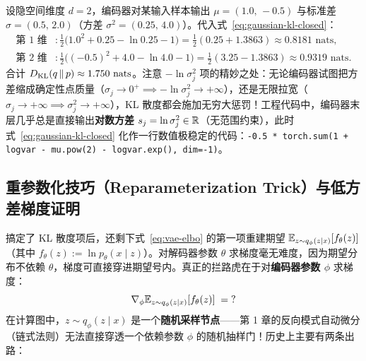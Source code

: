 \begin{example}
设隐空间维度 $d = 2$，编码器对某输入样本输出 $\mu = (1.0,\, -0.5)$ 与标准差 $\sigma = (0.5,\, 2.0)$（方差 $\sigma^2 = (0.25,\, 4.0)$）。代入式~\eqref{eq:gaussian-kl-closed}：
\begin{align*}
  \text{第 1 维} &: \frac{1}{2}\big(1.0^2 + 0.25 - \ln 0.25 - 1\big) = \frac{1}{2}(0.25 + 1.3863) \approx 0.8181\text{ nats}, \\
  \text{第 2 维} &: \frac{1}{2}\big((-0.5)^2 + 4.0 - \ln 4.0 - 1\big) = \frac{1}{2}(3.25 - 1.3863) \approx 0.9319\text{ nats}.
\end{align*}
合计 $D_{\mathrm{KL}}(q \,\|\, p) \approx 1.750\text{ nats}$。注意 $-\ln \sigma_j^2$ 项的精妙之处：无论编码器试图把方差缩成确定性点质量（$\sigma_j \to 0^+ \implies -\ln\sigma_j^2 \to +\infty$），还是无限拉宽（$\sigma_j \to +\infty \implies \sigma_j^2 \to +\infty$），KL 散度都会施加无穷大惩罚！工程代码中，编码器末层几乎总是直接输出\textbf{对数方差} $s_j = \ln \sigma_j^2 \in \mathbb{R}$（无范围约束），此时式~\eqref{eq:gaussian-kl-closed} 化作一行数值极稳定的代码：\texttt{-0.5 * torch.sum(1 + logvar - mu.pow(2) - logvar.exp(), dim=-1)}。
\end{example}

\subsection{重参数化技巧（Reparameterization Trick）与低方差梯度证明}
\label{sec:reparam}

搞定了 KL 散度项后，还剩下式~\eqref{eq:vae-elbo} 的第一项重建期望 $\mathbb{E}_{z \sim q_\phi(z \mid x)}[f_\theta(z)]$（其中 $f_\theta(z) := \ln p_\theta(x \mid z)$）。对解码器参数 $\theta$ 求梯度毫无难度，因为期望分布不依赖 $\theta$，梯度可直接穿进期望号内。真正的拦路虎在于对\textbf{编码器参数 $\phi$} 求梯度：
\[
  \nabla_\phi \mathbb{E}_{z \sim q_\phi(z \mid x)}\!\left[f_\theta(z)\right] \;=\; ?
\]
在计算图中，$z \sim q_\phi(z \mid x)$ 是一个\textbf{随机采样节点}——第 1 章的反向模式自动微分（链式法则）无法直接穿透一个依赖参数 $\phi$ 的随机抽样门！历史上主要有两条出路：

